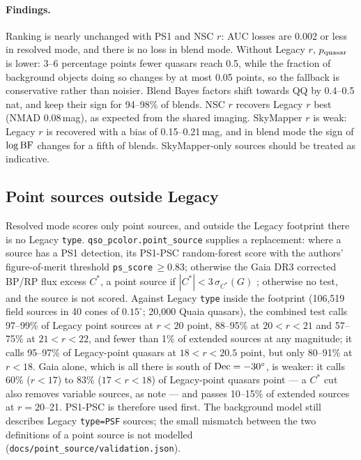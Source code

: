 \documentclass[11pt,a4paper]{article}
\newcommand{\code}[1]{\texttt{#1}}
\begin{document}
\paragraph{Findings.} Ranking is nearly unchanged with PS1 and NSC $r$: AUC losses are 0.002 or less in resolved
mode, and there is no loss in blend mode. Without Legacy $r$, $p_{\rm quasar}$ is lower: 3--6 percentage points
fewer quasars reach 0.5, while the fraction of background objects doing so changes by at most 0.05 points, so the
fallback is conservative rather than noisier. Blend Bayes factors shift towards QQ by 0.4--0.5\,nat, and keep
their sign for 94--98\% of blends. NSC $r$ recovers Legacy $r$ best (NMAD 0.08\,mag), as expected from the shared
imaging. SkyMapper $r$ is weak: Legacy $r$ is recovered with a bias of
0.15--0.21\,mag, and in blend mode the sign of $\log{\rm BF}$ changes for a fifth of blends. SkyMapper-only sources
should be treated as indicative.

\subsection{Point sources outside Legacy}\label{sec:pointsource}
Resolved mode scores only point sources, and outside the Legacy footprint there is no Legacy \code{type}.
\code{qso\_pcolor.point\_source} supplies a replacement: where a source has a PS1 detection, its PS1-PSC
random-forest score \citep{Tachibana2018} with the authors' figure-of-merit threshold \code{ps\_score}$\,\geq0.83$;
otherwise the Gaia DR3 corrected BP/RP flux excess $C^*$, a point source if $|C^*|<3\,\sigma_{C^*}(G)$
\citep[Table~2 and Eq.~18 of][]{Riello2021}; otherwise no test, and the source is not scored. Against Legacy
\code{type} inside the footprint (106,519 field sources in 40 cones of $0.15^\circ$; 20,000 Quaia quasars), the
combined test calls 97--99\% of Legacy point sources at $r<20$ point, 88--95\% at $20<r<21$ and 57--75\% at
$21<r<22$, and fewer than 1\% of extended sources at any magnitude; it calls 95--97\% of Legacy-point quasars at
$18<r<20.5$ point, but only 80--91\% at $r<18$. Gaia alone, which is all there is south of ${\rm Dec}=-30^\circ$, is
weaker: it calls 60\% ($r<17$) to 83\% ($17<r<18$) of Legacy-point quasars point --- a $C^*$ cut also removes
variable sources, as \citet{Riello2021} note --- and passes 10--15\% of extended sources at $r=20$--21. PS1-PSC
is therefore used first. The background model still describes Legacy \code{type=PSF} sources; the small
mismatch between the two definitions of a point source is not modelled (\code{docs/point\_source/validation.json}).
\end{document}
